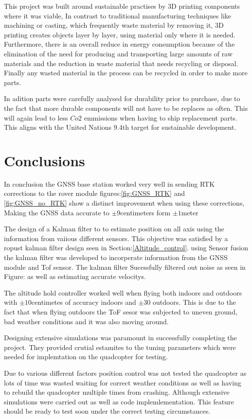 \documentclass{report}
\begin{document}
This project was built around sustainable practises by 3D printing components where it was viable, In contrast to traditional manufacturing techniques like machining or casting, which frequently waste material by removing it, 3D printing creates objects layer by layer, using material only where it is needed. Furthermore, there is an overall reduce in energy consumption because of the elimination of the need for producing and transporting large amounts of raw materials and the reduction in waste material that needs recycling or disposal. Finally any wasted material in the process can be recycled in order to make more parts.

In adition parts were carefully analysed for durability prior to purchase, due to the fact that more durable components will not have to be replaces as often. This will again lead to less \(Co2\) emmissions when having to ship replacement parts. This aligns with the United Nations 9.4th target for sustainable development\cite{un}.

\chapter{Conclusions}
In conclusion the GNSS base station worked very well in sending RTK corrections to the rover module figures:\ref{fig:GNSS_RTK} and \ref{fig:GNSS_no_RTK} show a distinct improvement when using these corrections, Making the GNSS data accurate to \(\pm9\)centimeters form \(\pm1\)meter

The design of a Kalman filter to to estimate
position on all axis using the information from vaiious different sensors. This objective was satisfied by a ropust  kalman filter design seen in Section:\ref{Altitude_control}. using Sensor fusion the kalman filter was developed to incorperate information from the GNSS module and Tof sensor. The kalman filter Sucessfully filtered out noise as seen in Figure: as well as estimating accurate velocitys.

The altitude hold controller worked well when flying both indoors and outdoors with \(\pm10\)centimetes of accuracy indoors and \(\pm30\) outdoors. This is due to the fact that when flying outdoors the ToF sesor was subjected to uneven ground, bad weather conditions and it was also moving around. 

Designing extensive simulations was paramount in successfully completing the project. They provided crutial estamites to the tuning parameters which were needed for implemtation on the quadcopter for testing.

Due to various different factors position control was not tested the quadcopter as lots of time was wasted waiting for correct weather conditions as well as having to rebuild the quadcopter multiple times from crashing. Although extensive simulations were carried out as well as code implemlementation. This feature should be ready to test soon under the correct testing circumstances.



\end{document}

